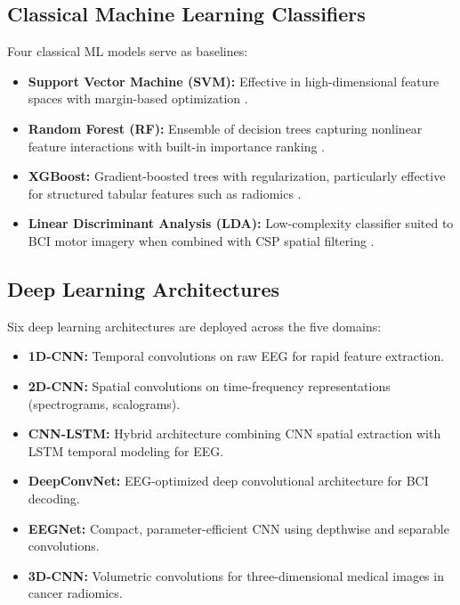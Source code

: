 \subsection{Classical Machine Learning Classifiers}

Four classical ML models serve as baselines:

\begin{itemize}
    \item \textbf{Support Vector Machine (SVM):} Effective in high-dimensional feature spaces with margin-based optimization \citep{cortes1995svm}.
    \item \textbf{Random Forest (RF):} Ensemble of decision trees capturing nonlinear feature interactions with built-in importance ranking \citep{breiman2001randomforests}.
    \item \textbf{XGBoost:} Gradient-boosted trees with regularization, particularly effective for structured tabular features such as radiomics \citep{chen2016xgboost}.
    \item \textbf{Linear Discriminant Analysis (LDA):} Low-complexity classifier suited to BCI motor imagery when combined with CSP spatial filtering \citep{ramoser2000csp}.
\end{itemize}

\subsection{Deep Learning Architectures}

Six deep learning architectures are deployed across the five domains:

\begin{itemize}
    \item \textbf{1D-CNN:} Temporal convolutions on raw EEG for rapid feature extraction.
    \item \textbf{2D-CNN:} Spatial convolutions on time-frequency representations (spectrograms, scalograms).
    \item \textbf{CNN-LSTM:} Hybrid architecture combining CNN spatial extraction with LSTM temporal modeling for EEG.
    \item \textbf{DeepConvNet:} EEG-optimized deep convolutional architecture for BCI decoding.
    \item \textbf{EEGNet:} Compact, parameter-efficient CNN using depthwise and separable convolutions.
    \item \textbf{3D-CNN:} Volumetric convolutions for three-dimensional medical images in cancer radiomics.
\end{itemize}

